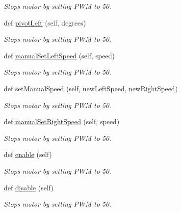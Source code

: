 \begin{DoxyCompactItemize}
\begin{DoxyCompactList}\small\item\em Stops motor by setting P\+WM to 50. \end{DoxyCompactList}\item 
def \hyperlink{classmcs_1_1controllers_1_1DriveControl_1_1DriveControl_a6954c2742f1beb86a0c14ca9c36fd981}{pivot\+Left} (self, degrees)
\begin{DoxyCompactList}\small\item\em Stops motor by setting P\+WM to 50. \end{DoxyCompactList}\item 
def \hyperlink{classmcs_1_1controllers_1_1DriveControl_1_1DriveControl_af6471cb50fa531d8fcf99efa6d2404a1}{manual\+Set\+Left\+Speed} (self, speed)
\begin{DoxyCompactList}\small\item\em Stops motor by setting P\+WM to 50. \end{DoxyCompactList}\item 
def \hyperlink{classmcs_1_1controllers_1_1DriveControl_1_1DriveControl_a9226391f112c7ce7678b92fb4cce35d5}{set\+Manual\+Speed} (self, new\+Left\+Speed, new\+Right\+Speed)
\begin{DoxyCompactList}\small\item\em Stops motor by setting P\+WM to 50. \end{DoxyCompactList}\item 
def \hyperlink{classmcs_1_1controllers_1_1DriveControl_1_1DriveControl_a62fbcb533f165f1496f542723e57bf9c}{manual\+Set\+Right\+Speed} (self, speed)
\begin{DoxyCompactList}\small\item\em Stops motor by setting P\+WM to 50. \end{DoxyCompactList}\item 
def \hyperlink{classmcs_1_1controllers_1_1DriveControl_1_1DriveControl_a6628f4838460a30cb7f79b0a016d9252}{enable} (self)
\begin{DoxyCompactList}\small\item\em Stops motor by setting P\+WM to 50. \end{DoxyCompactList}\item 
def \hyperlink{classmcs_1_1controllers_1_1DriveControl_1_1DriveControl_a60de3e5465cde29045bb752865223281}{disable} (self)
\begin{DoxyCompactList}\small\item\em Stops motor by setting P\+WM to 50. \end{DoxyCompactList}\item 

\end{DoxyCompactItemize}
